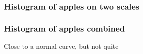 \documentclass[handout]{beamer}
\begin{document}


   \begin{frame}
   \frametitle{Histogram of apples on two scales}
   \begin{center}
   \end{center}

   \end{frame}



   \begin{frame}
   \frametitle{Histogram of apples combined}
   \begin{center}
   \end{center}
   Close to a normal curve, but not quite
   \end{frame}

\end{document}
